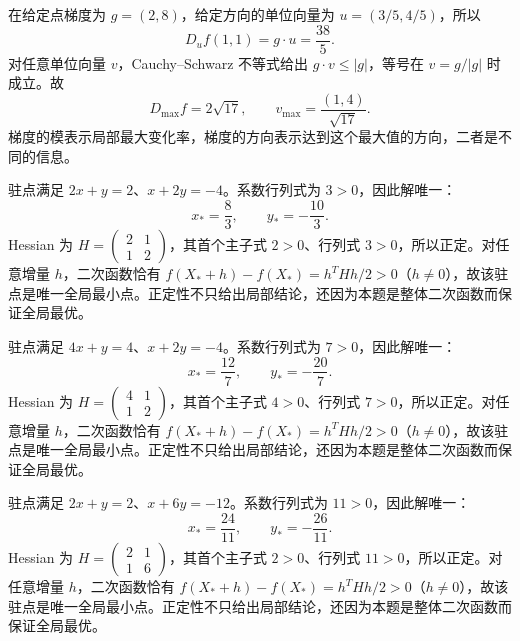 \documentclass[UTF8,12pt,a4paper,fontset=fandol]{ctexart}
\begin{document}
\begin{solve}\label{ans:c34q13}
在给定点梯度为 $g=(2,8)$，给定方向的单位向量为 $u=(3/5,4/5)$，所以
\[
D_uf(1,1)=g\cdot u=\frac{38}{5}.
\]
对任意单位向量 $v$，Cauchy--Schwarz 不等式给出 $g\cdot v\le|g|$，等号在 $v=g/|g|$ 时成立。故
\[
D_{\max}f=2\sqrt{17},\qquad v_{\max}=\frac{(1,4)}{\sqrt{17}}.
\]
梯度的模表示局部最大变化率，梯度的方向表示达到这个最大值的方向，二者是不同的信息。
\end{solve}

\begin{solve}\label{ans:c34q14}
驻点满足 $2x+y=2$、$x+2y=-4$。系数行列式为 $3>0$，因此解唯一：
\[
x_*=\frac{8}{3},\qquad y_*=-\frac{10}{3}.
\]
Hessian 为 $H=\begin{pmatrix}2&1\\1&2\end{pmatrix}$，其首个主子式 $2>0$、行列式 $3>0$，所以正定。对任意增量 $h$，二次函数恰有 $f(X_*+h)-f(X_*)=h^THh/2>0$（$h\ne0$），故该驻点是唯一全局最小点。正定性不只给出局部结论，还因为本题是整体二次函数而保证全局最优。
\end{solve}

\begin{solve}\label{ans:c34q15}
驻点满足 $4x+y=4$、$x+2y=-4$。系数行列式为 $7>0$，因此解唯一：
\[
x_*=\frac{12}{7},\qquad y_*=-\frac{20}{7}.
\]
Hessian 为 $H=\begin{pmatrix}4&1\\1&2\end{pmatrix}$，其首个主子式 $4>0$、行列式 $7>0$，所以正定。对任意增量 $h$，二次函数恰有 $f(X_*+h)-f(X_*)=h^THh/2>0$（$h\ne0$），故该驻点是唯一全局最小点。正定性不只给出局部结论，还因为本题是整体二次函数而保证全局最优。
\end{solve}

\begin{solve}\label{ans:c34q16}
驻点满足 $2x+y=2$、$x+6y=-12$。系数行列式为 $11>0$，因此解唯一：
\[
x_*=\frac{24}{11},\qquad y_*=-\frac{26}{11}.
\]
Hessian 为 $H=\begin{pmatrix}2&1\\1&6\end{pmatrix}$，其首个主子式 $2>0$、行列式 $11>0$，所以正定。对任意增量 $h$，二次函数恰有 $f(X_*+h)-f(X_*)=h^THh/2>0$（$h\ne0$），故该驻点是唯一全局最小点。正定性不只给出局部结论，还因为本题是整体二次函数而保证全局最优。
\end{solve}
\end{document}
